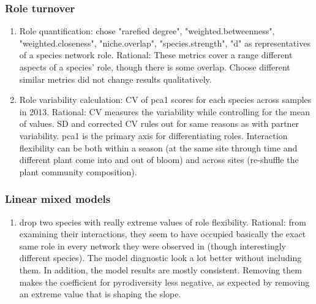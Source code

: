 \documentclass{article}\usepackage[]{graphicx}\usepackage[]{color}
\begin{document}
\subsubsection{Role turnover}
  \label{sec:pop_resist_dp2}
\begin{enumerate}
\item Role quantification: chose "rarefied degree",
  "weighted.betweenness", "weighted.closeness", "niche.overlap",
  "species.strength", "d" as representatives of a species network
  role. Rational: These metrics cover a range different aspects of a
  species' role, though there is some overlap. Choose different
  similar metrics did not change results qualitatively.
\item Role variability calculation: CV of pca1 scores for each species
  across samples in 2013. Rational: CV measures the variability while
  controlling for the mean of values. SD and corrected CV rules out
  for same reasons as with partner variability. pca1 is the primary
  axis for differentiating roles. Interaction flexibility can be both
  within a season (at the same site through time and different plant
  come into and out of bloom) and across sites (re-shuffle the plant
  community composition).
\end{enumerate}
  
\subsubsection{Linear mixed models}
  \label{sec:pop_resist_dp3}
\begin{enumerate}
  \item drop two species with really extreme values of role
    flexibility. Rational: from examining their interactions, they
    seem to have occupied basically the exact same role in every
    network they were observed in (though interestingly different
    species). The model diagnostic look a lot better without including
    them. In addition, the model results are mostly
    consistent. Removing them makes the coefficient for pyrodiversity
    less negative, as expected by removing an extreme value that is
    shaping the slope. 
  \end{enumerate}
  

\clearpage

\clearpage
\end{document}
